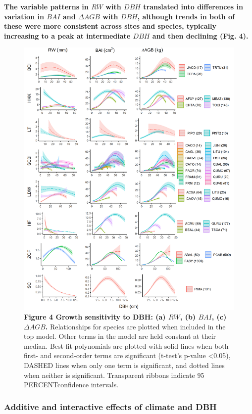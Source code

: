 \documentclass[
]{article}
\begin{document}
\textbf{The variable patterns in \(RW\) with \(DBH\) translated into
differences in variation in \(BAI\) and \(\Delta AGB\) with \(DBH\),
although trends in both of these were more consistent across sites and
species, typically increasing to a peak at intermediate \(DBH\) and then
declining (Fig. 4).}

\begin{figure}
\centering
\includegraphics{tables_figures/DBH_responses.png}
\caption{\textbf{Figure 4 \textbar{} Growth sensitivity to DBH: (a)
\(RW\), (b) \(BAI\), (c) \(\Delta AGB\).} Relationships for species are
plotted when included in the top model. Other terms in the model are
held constant at their median. Best-fit polynomials are plotted with
solid lines when both first- and second-order terms are significant
(t-test's p-value \textless0.05), DASHED lines when only one term is
significant, and dotted lines when neither is significant. Transparent
ribbons indicate 95 PERCENTconfidence intervals.}
\end{figure}

\hypertarget{additive-and-interactive-effects-of-climate-and-dbh}{%
\subsubsection{Additive and interactive effects of climate and
DBH}\label{additive-and-interactive-effects-of-climate-and-dbh}}
\end{document}
